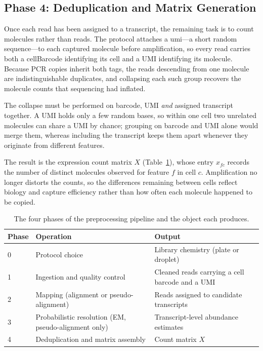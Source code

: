 \subsection{Phase 4: Deduplication and Matrix Generation}

Once each read has been assigned to a transcript, the remaining task is to count molecules rather than reads. The protocol attaches a \gls{umi}---a short random sequence---to each captured molecule before amplification, so every read carries both a \gls{cellBarcode} identifying its cell and a UMI identifying its molecule. Because PCR copies inherit both tags, the reads descending from one molecule are indistinguishable duplicates, and collapsing each such group recovers the molecule counts that sequencing had inflated.

The collapse must be performed on barcode, UMI \emph{and} assigned transcript together. A UMI holds only a few random bases, so within one cell two unrelated molecules can share a UMI by chance; grouping on barcode and UMI alone would merge them, whereas including the transcript keeps them apart whenever they originate from different features.

The result is the expression count matrix $X$ (Table~\ref{tab:pipeline-phases}), whose entry $x_{fc}$ records the number of distinct molecules observed for feature $f$ in cell $c$. Amplification no longer distorts the counts, so the differences remaining between cells reflect biology and capture efficiency rather than how often each molecule happened to be copied.

\begin{table}[h]
\centering
\small
\caption{The four phases of the preprocessing pipeline and the object each produces.}
\label{tab:pipeline-phases}
\begin{tabular}{@{}p{1.3cm}p{5.7cm}p{6.5cm}@{}}
\toprule
Phase & Operation & Output \\
\midrule
0 & Protocol choice & Library chemistry (plate or droplet) \\
1 & Ingestion and quality control & Cleaned reads carrying a cell barcode and a UMI \\
2 & Mapping (alignment or pseudo-alignment) & Reads assigned to candidate transcripts \\
3 & Probabilistic resolution (EM, pseudo-alignment only) & Transcript-level abundance estimates \\
4 & Deduplication and matrix assembly & Count matrix $X$ \\
\bottomrule
\end{tabular}
\end{table}

